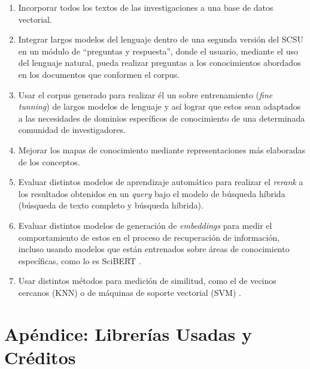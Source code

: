 \documentclass[
  12pt,
  openany]{book}
\begin{document}
\begin{enumerate}
  \begin{enumerate}
  \def\labelenumii{\roman{enumii}.}
  \item
    Incorporar todos los textos de las investigaciones a una base de datos vectorial.
  \item
    Integrar largos modelos del lenguaje dentro de una segunda versión del SCSU en un módulo de ``preguntas y respuesta'', donde el usuario, mediante el uso del lenguaje natural, pueda realizar preguntas a los conocimientos abordados en los documentos que conformen el corpus.
  \item
    Usar el corpus generado para realizar él un sobre entrenamiento (\emph{fine tunning}) de largos modelos de lenguaje y así lograr que estos sean adaptados a las necesidades de dominios específicos de conocimiento de una determinada comunidad de investigadores.
  \item
    Mejorar los mapas de conocimiento mediante representaciones más elaboradas de los conceptos.
  \item
    Evaluar distintos modelos de aprendizaje automático para realizar el \emph{rerank} a los resultados obtenidos en un \emph{query} bajo el modelo de búsqueda híbrida (búsqueda de texto completo y búsqueda híbrida).
  \item
    Evaluar distintos modelos de generación de \emph{embeddings} para medir el comportamiento de estos en el proceso de recuperación de información, incluso usando modelos que están entrenados sobre áreas de conocimiento específicas, como lo es SciBERT \citep{beltagy2019}.
  \item
    Usar distintos métodos para medición de similitud, como el de vecinos cercanos (KNN) \citep{annoy2023} o de máquinas de soporte vectorial (SVM) \citep{svm2023}.
  \end{enumerate}
\end{enumerate}

\hypertarget{apuxe9ndice-libreruxedas-usadas-y-cruxe9ditos}{%
\chapter*{Apéndice: Librerías Usadas y Créditos}\label{apuxe9ndice-libreruxedas-usadas-y-cruxe9ditos}}
\end{document}
